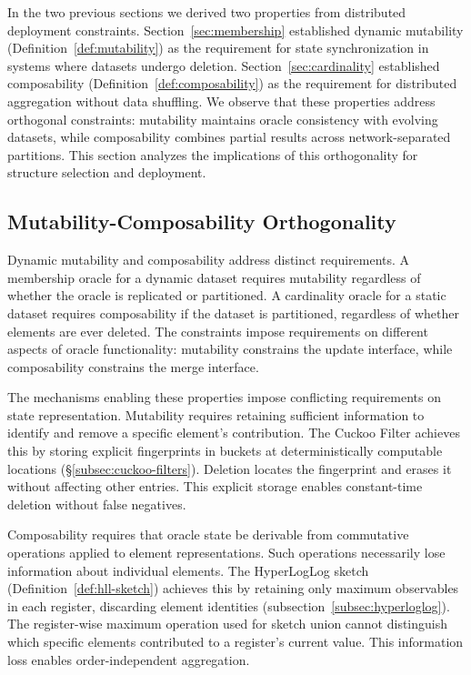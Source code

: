 In the two previous sections we derived two properties from distributed deployment constraints. Section~\ref{sec:membership} established dynamic mutability (Definition~\ref{def:mutability}) as the requirement for state synchronization in systems where datasets undergo deletion. Section~\ref{sec:cardinality} established composability (Definition~\ref{def:composability}) as the requirement for distributed aggregation without data shuffling. We observe that these properties address orthogonal constraints: mutability maintains oracle consistency with evolving datasets, while composability combines partial results across network-separated partitions. This section analyzes the implications of this orthogonality for structure selection and deployment.

\subsection{Mutability-Composability Orthogonality}
\label{subsec:core-properties}

Dynamic mutability and composability address distinct requirements. A membership oracle for a dynamic dataset requires mutability regardless of whether the oracle is replicated or partitioned. A cardinality oracle for a static dataset requires composability if the dataset is partitioned, regardless of whether elements are ever deleted. The constraints impose requirements on different aspects of oracle functionality: mutability constrains the update interface, while composability constrains the merge interface.

The mechanisms enabling these properties impose conflicting requirements on state representation. Mutability requires retaining sufficient information to identify and remove a specific element's contribution. The Cuckoo Filter achieves this by storing explicit fingerprints in buckets at deterministically computable locations (\S\ref{subsec:cuckoo-filters}). Deletion locates the fingerprint and erases it without affecting other entries. This explicit storage enables constant-time deletion without false negatives.

Composability requires that oracle state be derivable from commutative operations applied to element representations. Such operations necessarily lose information about individual elements. The HyperLogLog sketch (Definition~\ref{def:hll-sketch}) achieves this by retaining only maximum observables in each register, discarding element identities (subsection~\ref{subsec:hyperloglog}). The register-wise maximum operation used for sketch union cannot distinguish which specific elements contributed to a register's current value. This information loss enables order-independent aggregation.

